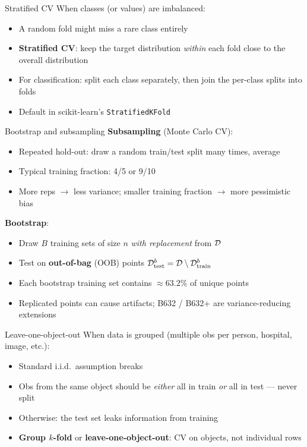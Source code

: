 \documentclass[aspectratio=169]{beamer}
\begin{document}
\begin{frame}{Stratified CV}
  When classes (or values) are imbalanced:
  \begin{itemize}
    \item A random fold might miss a rare class entirely
    \item \textbf{Stratified CV}: keep the target distribution \emph{within} each fold close to the overall distribution
    \item For classification: split each class separately, then join the per-class splits into folds
    \item Default in scikit-learn's \texttt{StratifiedKFold}
  \end{itemize}
\end{frame}

\begin{frame}{Bootstrap and subsampling}
  \textbf{Subsampling} (Monte Carlo CV):
  \begin{itemize}\small
    \item Repeated hold-out: draw a random train/test split many times, average
    \item Typical training fraction: 4/5 or 9/10
    \item More reps $\to$ less variance; smaller training fraction $\to$ more pessimistic bias
  \end{itemize}
  \vfill
  \textbf{Bootstrap}:
  \begin{itemize}\small
    \item Draw $B$ training sets of size $n$ \emph{with replacement} from $\mathcal{D}$
    \item Test on \textbf{out-of-bag} (OOB) points $\mathcal{D}_{\text{test}}^b = \mathcal{D} \setminus \mathcal{D}_{\text{train}}^b$
    \item Each bootstrap training set contains $\approx 63.2\%$ of unique points
    \item Replicated points can cause artifacts; B632 / B632+ are variance-reducing extensions
  \end{itemize}
\end{frame}

\begin{frame}{Leave-one-object-out}
  When data is grouped (multiple obs per person, hospital, image, etc.):
  \begin{itemize}
    \item Standard i.i.d.\ assumption breaks
    \item Obs from the same object should be \emph{either} all in train \emph{or} all in test — never split
    \item Otherwise: the test set leaks information from training
    \item \textbf{Group $k$-fold} or \textbf{leave-one-object-out}: CV on objects, not individual rows
  \end{itemize}
\end{frame}
\end{document}
